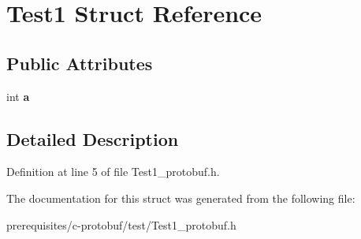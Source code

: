 \hypertarget{struct_test1}{}\section{Test1 Struct Reference}
\label{struct_test1}
\subsection*{Public Attributes}
\begin{DoxyCompactItemize}
\item 
\mbox{\label{struct_test1_adc0ee078ff22677a87ee3e48dda6425e}} 
int {\bfseries a}
\end{DoxyCompactItemize}


\subsection{Detailed Description}


Definition at line 5 of file Test1\+\_\+protobuf.\+h.



The documentation for this struct was generated from the following file\+:\begin{DoxyCompactItemize}
\item 
prerequisites/c-\/protobuf/test/Test1\+\_\+protobuf.\+h\end{DoxyCompactItemize}
